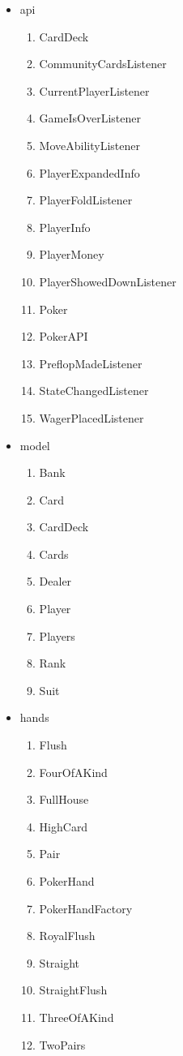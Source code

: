 \begin{itemize}

\item api

\begin{enumerate}

\item CardDeck
\item CommunityCardsListener
\item CurrentPlayerListener
\item GameIsOverListener
\item MoveAbilityListener
\item PlayerExpandedInfo
\item PlayerFoldListener
\item PlayerInfo
\item PlayerMoney
\item PlayerShowedDownListener
\item Poker
\item PokerAPI
\item PreflopMadeListener
\item StateChangedListener
\item WagerPlacedListener

\end{enumerate}

\item model

\begin{enumerate}

\item Bank
\item Card
\item CardDeck
\item Cards
\item Dealer
\item Player
\item Players
\item Rank
\item Suit

\end{enumerate}

\item hands

\begin{enumerate}

\item Flush
\item  FourOfAKind
\item  FullHouse
\item  HighCard
\item  Pair
\item  PokerHand
\item  PokerHandFactory
\item  RoyalFlush
\item  Straight
\item StraightFlush
\item ThreeOfAKind
\item TwoPairs


\end{enumerate}
\end{itemize}
